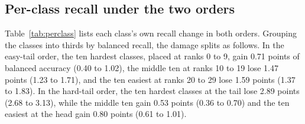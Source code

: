 \subsection{Per-class recall under the two orders}
\label{sec:perclass-results}
Table~\ref{tab:perclass} lists each class's own recall change in both orders. Grouping the classes into thirds by balanced recall, the damage splits as follows. In the easy-tail order, the ten hardest classes, placed at ranks 0 to 9, gain 0.71 points of balanced accuracy (0.40 to 1.02), the middle ten at ranks 10 to 19 lose 1.47 points (1.23 to 1.71), and the ten easiest at ranks 20 to 29 lose 1.59 points (1.37 to 1.83). In the hard-tail order, the ten hardest classes at the tail lose 2.89 points (2.68 to 3.13), while the middle ten gain 0.53 points (0.36 to 0.70) and the ten easiest at the head gain 0.80 points (0.61 to 1.01).

